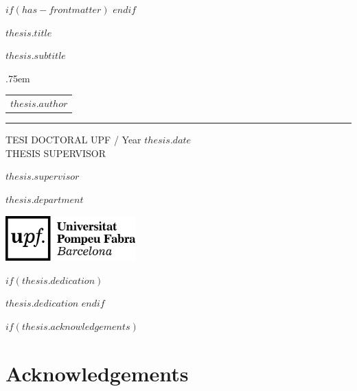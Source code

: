 $if(has-frontmatter)$
\frontmatter
$endif$


\begin{titlepage}
    \null\vfil
    \begin{flushleft}%
      {\LARGE \sffamily $thesis.title$ \par}%
      \vspace*{2cm}
      {\Large \sffamily $thesis.subtitle$ \par}%
      \vskip 1cm%
      {\large \lineskip .75em \begin{tabular}[t]{c} {\Huge $thesis.author$} \end{tabular}\par}
      \rule{\linewidth}{1mm} \par
      \vskip 1cm%
      {\large TESI DOCTORAL UPF / Year $thesis.date$}\\[2cm]
      {\normalsize THESIS SUPERVISOR}\par
      {\large $thesis.supervisor$}\par
      {\large $thesis.department$} \par
      \vspace{2cm}
     \centering
      \includegraphics[width=5cm]{logo_upf.png}
     \end{flushleft}\par
     \afterpage{\blankpage}
\end{titlepage}


\newpage


$if(thesis.dedication)$

\vspace*{\baselineskip}

\normalsize{$thesis.dedication$}
\newpage
\afterpage{\blankpage}
$endif$




$if(thesis.acknowledgements)$
\chapter*{\sffamily Acknowledgements}

